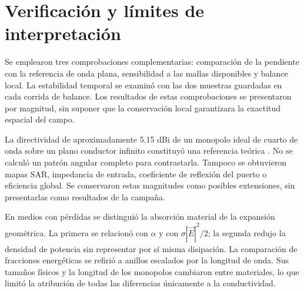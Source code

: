 \section{Verificación y límites de interpretación}
Se emplearon tres comprobaciones complementarias: comparación de la pendiente con la referencia de onda plana, sensibilidad a las mallas disponibles y balance local. La estabilidad temporal se examinó con las dos muestras guardadas en cada corrida de balance. Los resultados de estas comprobaciones se presentaron por magnitud, sin suponer que la conservación local garantizara la exactitud espacial del campo.

La directividad de aproximadamente 5.15 dBi de un monopolo ideal de cuarto de onda sobre un plano conductor infinito constituyó una referencia teórica \citep{Balanis2016}. No se calculó un patrón angular completo para contrastarla. Tampoco se obtuvieron mapas SAR, impedancia de entrada, coeficiente de reflexión del puerto o eficiencia global. Se conservaron estas magnitudes como posibles extensiones, sin presentarlas como resultados de la campaña.

En medios con pérdidas se distinguió la absorción material de la expansión geométrica. La primera se relacionó con $\alpha$ y con $\sigma|\vec E|^2/2$; la segunda redujo la densidad de potencia sin representar por sí misma disipación. La comparación de fracciones energéticas se refirió a anillos escalados por la longitud de onda. Sus tamaños físicos y la longitud de los monopolos cambiaron entre materiales, lo que limitó la atribución de todas las diferencias únicamente a la conductividad.
